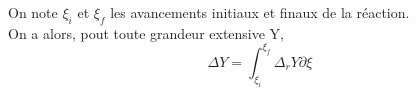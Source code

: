 ﻿\documentclass[a4paper]{article}
\begin{document}
\pagestyle{fancy}
\fancyhf{}
\setlength{\headheight}{15pt}

\begin{center}
	\large{}
\end{center}


On note \(\xi_i\) et \(\xi_f\) les avancements initiaux et finaux de la réaction.\\
On a alors, pout toute grandeur extensive Y, \[\Delta Y=\int_{\xi_i}^{\xi_f}\Delta_rY\partial\xi\]
\end{document}
